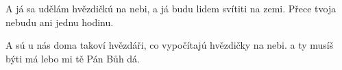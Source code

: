 \beginverse{}
A já sa udělám hvězdičkú na nebi,
a já budu lidem svítiti na zemi.
Přece tvoja nebudu ani jednu hodinu.
\endverse{}

\beginverse{}
A sú u nás doma takoví hvězdáři,
co vypočítajú hvězdičky na nebi.
a ty musíš býti má lebo mi tě Pán Bůh dá.
\endverse{}

\endsong{}
